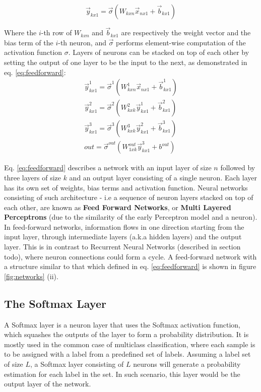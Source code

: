 \begin{equation}
    \vec{y}_{kx1} = \vec{\sigma}({W_{kxn}\vec{x}_{nx1}} + \vec{b}_{kx1})
    \label{eq:neuronlayer}
\end{equation}

Where the \(i\)-th row of \(W_{kxn}\) and \(\vec{b}_{kx1}\) are respectively the weight vector and the bias term of the \(i\)-th neuron, and \(\vec{\sigma}\) performs element-wise computation of the activation function \(\sigma\). Layers of neurons can be stacked on top of each other by setting the output of one layer to be the input to the next, as demonstrated in eq. \ref{eq:feedforward}:
\begin{equation}
    \begin{split}
    \vec{y}^1_{kx1} = \vec{\sigma}^1({W^1_{kxn}\vec{x}_{nx1}} + \vec{b}^1_{kx1}) \\
    \vec{y}^2_{kx1} = \vec{\sigma}^2({W^2_{kxk}\vec{y}^1_{kx1}} + \vec{b}^2_{kx1}) \\
    \vec{y}^3_{kx1} = \vec{\sigma}^3({W^3_{kxk}\vec{y}^2_{kx1}} + \vec{b}^3_{kx1}) \\
    out = \vec{\sigma}^{out}({W^{out}_{1xk}\vec{y}^3_{kx1}} + b^{out})
    \end{split}
    \label{eq:feedforward}
\end{equation}

Eq. \ref{eq:feedforward} describes a network with an input layer of size \(n\) followed by three layers of size \(k\) and an output layer consisting of a single neuron. Each layer has its own set of weights, bias terms and activation function. Neural networks consisting of such architecture - i.e a sequence of neuron layers stacked on top of each other, are known as \textbf{Feed Forward Networks}, or \textbf{Multi Layered Perceptrons} (due to the similarity of the early Perceptron model and a neuron). In feed-forward networks, information flows in one direction starting from the input layer, through intermediate layers (a.k.a hidden layers) and the output layer. This is in contrast to Recurrent Neural Networks (described in section todo), where neuron connections could form a cycle. A feed-forward network with a structure similar to that which defined in eq. \ref{eq:feedforward} is shown in figure \ref{fig:networks} (ii).

\subsection{The Softmax Layer}
A Softmax layer is a neuron layer that uses the Softmax activation function, which squashes the outputs of the layer to form a probability distribution. It is mostly used in the common case of multiclass classification, where each sample is to be assigned with a label from a predefined set of labels. Assuming a label set of size $L$, a Softmax layer consisting of $L$ neurons will generate a probability estimation for each label in the set. In such scenario, this layer would be the output layer of the network.

